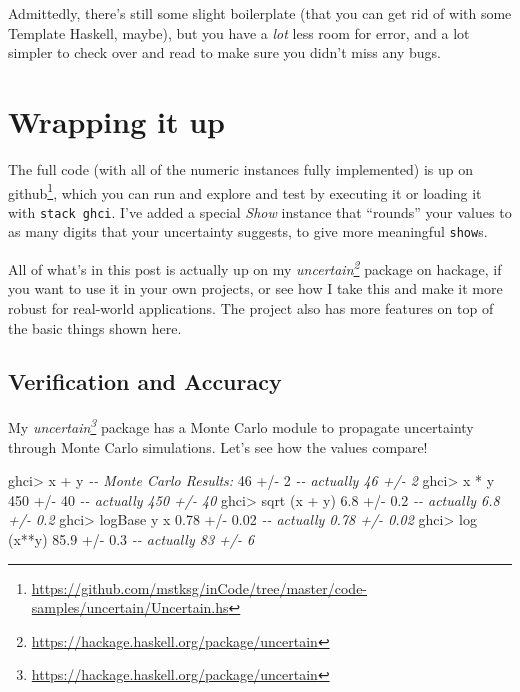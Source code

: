\documentclass[]{article}
\newenvironment{Shaded}{}{}
\newcommand{\CommentTok}[1]{\textcolor[rgb]{0.38,0.63,0.69}{\textit{#1}}}
\newcommand{\DecValTok}[1]{\textcolor[rgb]{0.25,0.63,0.44}{#1}}
\newcommand{\FloatTok}[1]{\textcolor[rgb]{0.25,0.63,0.44}{#1}}
\newcommand{\FunctionTok}[1]{\textcolor[rgb]{0.02,0.16,0.49}{#1}}
\newcommand{\NormalTok}[1]{#1}
\newcommand{\OperatorTok}[1]{\textcolor[rgb]{0.40,0.40,0.40}{#1}}
\renewcommand{\href}[2]{#2\footnote{\url{#1}}}
\begin{document}
Admittedly, there's still some slight boilerplate (that you can get rid of with
some Template Haskell, maybe), but you have a \emph{lot} less room for error,
and a lot simpler to check over and read to make sure you didn't miss any bugs.

\hypertarget{wrapping-it-up}{%
\section{Wrapping it up}\label{wrapping-it-up}}

The full code (with all of the numeric instances fully implemented) is up
\href{https://github.com/mstksg/inCode/tree/master/code-samples/uncertain/Uncertain.hs}{on
github}, which you can run and explore and test by executing it or loading it
with \texttt{stack\ ghci}. I've added a special \emph{Show} instance that
``rounds'' your values to as many digits that your uncertainty suggests, to give
more meaningful \texttt{show}s.

All of what's in this post is actually up on my
\emph{\href{https://hackage.haskell.org/package/uncertain}{uncertain}} package
on hackage, if you want to use it in your own projects, or see how I take this
and make it more robust for real-world applications. The project also has more
features on top of the basic things shown here.

\hypertarget{verification-and-accuracy}{%
\subsection{Verification and Accuracy}\label{verification-and-accuracy}}

My \emph{\href{https://hackage.haskell.org/package/uncertain}{uncertain}}
package has a Monte Carlo module to propagate uncertainty through Monte Carlo
simulations. Let's see how the values compare!

\begin{Shaded}
\begin{Highlighting}[]
\NormalTok{ghci}\OperatorTok{>}\NormalTok{ x }\OperatorTok{+}\NormalTok{ y         }\CommentTok{{-}{-} Monte Carlo Results:}
\DecValTok{46} \OperatorTok{+/{-}} \DecValTok{2}            \CommentTok{{-}{-} actually 46 +/{-} 2}
\NormalTok{ghci}\OperatorTok{>}\NormalTok{ x }\OperatorTok{*}\NormalTok{ y}
\DecValTok{450} \OperatorTok{+/{-}} \DecValTok{40}          \CommentTok{{-}{-} actually 450 +/{-} 40}
\NormalTok{ghci}\OperatorTok{>} \FunctionTok{sqrt}\NormalTok{ (x }\OperatorTok{+}\NormalTok{ y)}
\FloatTok{6.8} \OperatorTok{+/{-}} \FloatTok{0.2}         \CommentTok{{-}{-} actually 6.8 +/{-} 0.2}
\NormalTok{ghci}\OperatorTok{>} \FunctionTok{logBase}\NormalTok{ y x}
\FloatTok{0.78} \OperatorTok{+/{-}} \FloatTok{0.02}       \CommentTok{{-}{-} actually 0.78 +/{-} 0.02}
\NormalTok{ghci}\OperatorTok{>} \FunctionTok{log}\NormalTok{ (x}\OperatorTok{**}\NormalTok{y)}
\FloatTok{85.9} \OperatorTok{+/{-}} \FloatTok{0.3}        \CommentTok{{-}{-} actually 83 +/{-} 6}
\end{Highlighting}
\end{Shaded}
\end{document}
